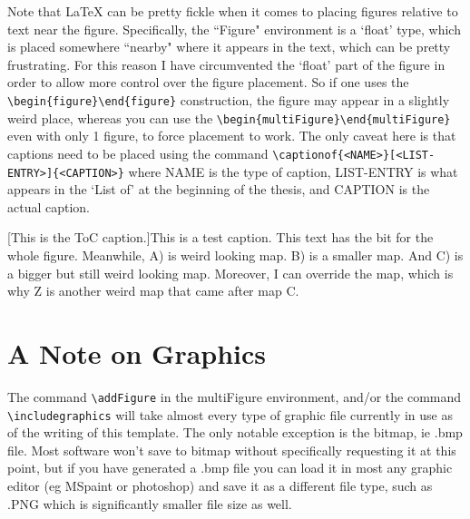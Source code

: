 \documentclass[../main.tex]{subfiles}
\begin{document}
Note that \LaTeX{} can be pretty fickle when it comes to placing figures relative to text near the figure. Specifically, the ``Figure" environment is a `float' type, which is placed somewhere ``nearby" where it appears in the text, which can be pretty frustrating. For this reason I have circumvented the `float' part of the figure in order to allow more control over the figure placement. So if one uses the \verb|\begin{figure}\end{figure}| construction, the figure may appear in a slightly weird place, whereas you can use the \verb|\begin{multiFigure}\end{multiFigure}| even with only 1 figure, to force placement to work. The only caveat here is that captions need to be placed using the command \verb|\captionof{<NAME>}[<LIST-ENTRY>]{<CAPTION>}| where NAME is the type of caption, LIST-ENTRY is what appears in the `List of' at the beginning of the thesis, and CAPTION is the actual caption.

\begin{flushleft}
\begin{multiFigure}
\begin{center}
\end{center}
[This is the ToC caption.]{This is a test caption. This text has the bit for the whole figure. Meanwhile, A) is weird looking map. B) is a smaller map. And C) is a bigger but still weird looking map. Moreover, I can override the map, which is why Z is another weird map that came after map C.}

\end{multiFigure}
\end{flushleft}

\section{A Note on Graphics}
The command \verb|\addFigure| in the multiFigure environment, and/or the command \verb|\includegraphics| will take almost every type of graphic file currently in use as of the writing of this template. The only notable exception is the bitmap, ie .bmp file. Most software won't save to bitmap without specifically requesting it at this point, but if you have generated a .bmp file you can load it in most any graphic editor (eg MSpaint or photoshop) and save it as a different file type, such as .PNG which is significantly smaller file size as well. 
\end{document}
